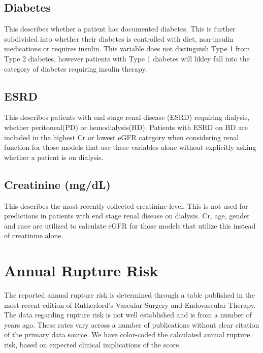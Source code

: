 \documentclass[
]{book}
\begin{document}
\hypertarget{diabetes}{%
\subsection{Diabetes}\label{diabetes}}

This describes whether a patient has documented diabetes. This is further subdivided into whether their diabetes is controlled with diet, non-insulin medications or requires insulin. This variable does not distinguish Type 1 from Type 2 diabetes, however patients with Type 1 diabetes will likley fall into the category of diabetes requiring insulin therapy.

\hypertarget{esrd}{%
\subsection{ESRD}\label{esrd}}

This describes patients with end stage renal disease (ESRD) requiring dialysis, whether peritoneal(PD) or hemodialysis(HD). Patients with ESRD on HD are included in the highest Cr or lowest eGFR category when considering renal function for those models that use these variables alone without explicitly asking whether a patient is on dialysis.

\hypertarget{creatinine-mgdl}{%
\subsection{Creatinine (mg/dL)}\label{creatinine-mgdl}}

This describes the most recently collected creatinine level. This is not used for predictions in patients with end stage renal disease on dialysis. Cr, age, gender and race are utilized to calculate eGFR for those models that utilize this instead of creatinine alone.

\hypertarget{annual-rupture-risk}{%
\section{Annual Rupture Risk}\label{annual-rupture-risk}}

The reported annual rupture risk is determined through a table published in the most recent edition of Rutherford's Vascular Surgery and Endovascular Therapy. \citet{tracciAortoiliacAneurysmsEvaluation} The data regarding rupture risk is not well established and is from a number of years ago. These rates vary across a number of publications without clear citation of the primary data source. We have color-coded the calculated annual rupture risk, based on expected clinical implications of the score.
\end{document}
